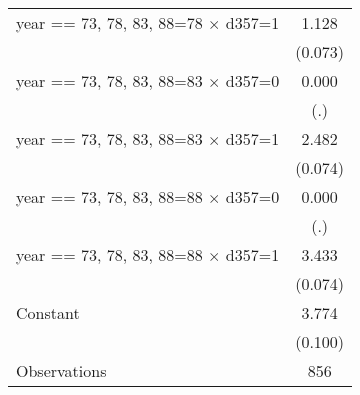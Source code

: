 \begin{table}[htbp]
\begin{tabular}{l*{1}{c}}
year == 73, 78, 83, 88=78 $\times$ d357=1&       1.128\sym{***}\\
                    &     (0.073)         \\
year == 73, 78, 83, 88=83 $\times$ d357=0&       0.000         \\
                    &         (.)         \\
year == 73, 78, 83, 88=83 $\times$ d357=1&       2.482\sym{***}\\
                    &     (0.074)         \\
year == 73, 78, 83, 88=88 $\times$ d357=0&       0.000         \\
                    &         (.)         \\
year == 73, 78, 83, 88=88 $\times$ d357=1&       3.433\sym{***}\\
                    &     (0.074)         \\
Constant            &       3.774\sym{***}\\
                    &     (0.100)         \\
\midrule
Observations        &         856         \\
\bottomrule
\end{tabular}
\end{table}
